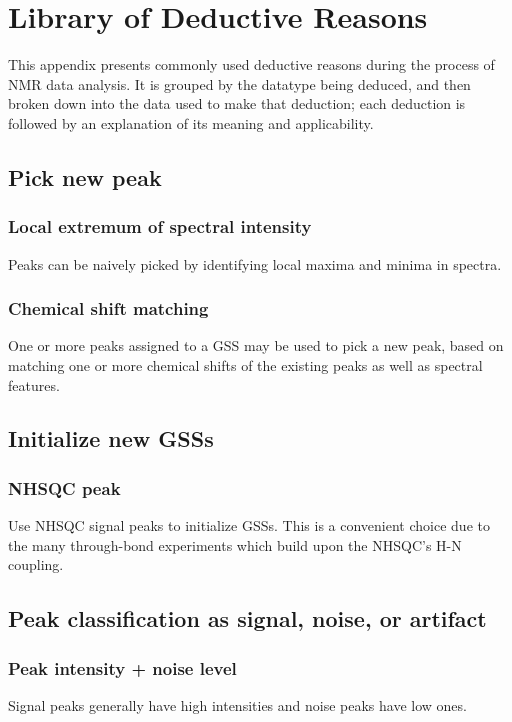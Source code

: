 \chapter{Library of Deductive Reasons}
\label{sec_library}

This appendix presents commonly used deductive reasons during the process
of NMR data analysis.  It is grouped by the datatype being deduced, and then
broken down into the data used to make that deduction; each deduction is 
followed by an explanation of its meaning and applicability.


\section*{Pick new peak}

\subsection*{Local extremum of spectral intensity}
Peaks can be naively picked by identifying local maxima and minima in spectra.

\subsection*{Chemical shift matching}
One or more peaks assigned to a GSS may be used to pick a new peak,
based on matching one or more chemical shifts of the existing peaks
as well as spectral features.



\section*{Initialize new GSSs}

\subsection*{NHSQC peak}
Use NHSQC signal peaks to initialize GSSs.  This is a convenient choice due
to the many through-bond experiments which build upon the NHSQC's H-N coupling.



\section*{Peak classification as signal, noise, or artifact}

\subsection*{Peak intensity + noise level}
Signal peaks generally have high intensities and noise peaks have low ones.

